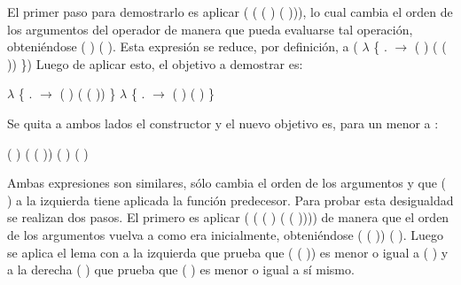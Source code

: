 \begin{AgdaAlign}
El primer paso para demostrarlo es aplicar (\AgdaFunction{$\sim\rightarrow\leq$} ( ( ) ( ))), lo cual cambia el orden de los argumentos del operador  de manera que pueda evaluarse tal operación, obteniéndose  ( ) ( ). Esta expresión se reduce, por definición, a ( $\lambda$ \{ . $\rightarrow$  ( ) ( ( )) \}) Luego de aplicar esto, el objetivo a demostrar es:
\begin{center}
\AgdaFunction{[}  \AgdaFunction{]}  $\lambda$ \{ . $\rightarrow$  ( ) ( ( )) \} \AgdaFunction{$\leq$}  $\lambda$ \{ . $\rightarrow$  ( ) ( ) \}
\end{center}

Se quita a ambos lados el constructor  y el nuevo objetivo es, para un  menor a :
\begin{center}
\AgdaFunction{[}  \AgdaFunction{]}  ( ) ( ( )) \AgdaFunction{$\leq$}  ( ) ( )
\end{center}

Ambas expresiones son similares, sólo cambia el orden de los argumentos y que ( ) a la izquierda tiene aplicada la función predecesor. Para probar esta desigualdad se realizan dos pasos. El primero es aplicar (\AgdaFunction{$\sim\rightarrow\leq$} ( ( ) ( ( )))) de manera que el orden de los argumentos vuelva a como era inicialmente, obteniéndose  ( ( )) ( ). Luego se aplica el lema  con  a la izquierda que prueba que ( ( )) es menor o igual a ( ) y a la derecha  ( ) que prueba que ( ) es menor o igual a sí mismo.


\end{AgdaAlign}
